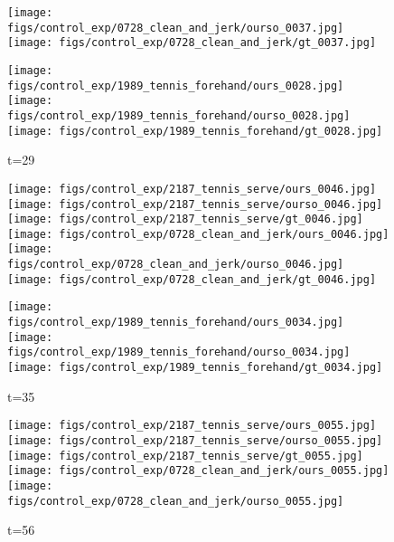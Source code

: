 \documentclass{article}
\begin{document}
\begin{appendix}
\begin{figure*}[!thbp]
\begin{subfigure}{0.12\linewidth}
  		\texttt{[image: figs/control\_exp/0728\_clean\_and\_jerk/ourso\_0037.jpg]}
  		\vspace{.2cm}
  		\texttt{[image: figs/control\_exp/0728\_clean\_and\_jerk/gt\_0037.jpg]}
  		\caption*{t=29}
  		\vspace{-7pt}
  		\texttt{[image: figs/control\_exp/1989\_tennis\_forehand/ours\_0028.jpg]}
  		\texttt{[image: figs/control\_exp/1989\_tennis\_forehand/ourso\_0028.jpg]}
  		\vspace{.2cm}
  		\texttt{[image: figs/control\_exp/1989\_tennis\_forehand/gt\_0028.jpg]}
	\end{subfigure}
	\begin{subfigure}{0.12\linewidth}
        \caption*{t=47}
        \vspace{-7pt}
	    \texttt{[image: figs/control\_exp/2187\_tennis\_serve/ours\_0046.jpg]}
	    \texttt{[image: figs/control\_exp/2187\_tennis\_serve/ourso\_0046.jpg]}
	    \vspace{.2cm}
  		\texttt{[image: figs/control\_exp/2187\_tennis\_serve/gt\_0046.jpg]}
  		\texttt{[image: figs/control\_exp/0728\_clean\_and\_jerk/ours\_0046.jpg]}
  		\texttt{[image: figs/control\_exp/0728\_clean\_and\_jerk/ourso\_0046.jpg]}
  		\vspace{.2cm}
  		\texttt{[image: figs/control\_exp/0728\_clean\_and\_jerk/gt\_0046.jpg]}
  		\caption*{t=35}
  		\vspace{-7pt}
  		\texttt{[image: figs/control\_exp/1989\_tennis\_forehand/ours\_0034.jpg]}
  		\texttt{[image: figs/control\_exp/1989\_tennis\_forehand/ourso\_0034.jpg]}
  		\vspace{.2cm}
  		\texttt{[image: figs/control\_exp/1989\_tennis\_forehand/gt\_0034.jpg]}
	\end{subfigure}
	\begin{subfigure}{0.12\linewidth}
        \caption*{t=56}
        \vspace{-7pt}
	    \texttt{[image: figs/control\_exp/2187\_tennis\_serve/ours\_0055.jpg]}
	    \texttt{[image: figs/control\_exp/2187\_tennis\_serve/ourso\_0055.jpg]}
	    \vspace{.2cm}
  		\texttt{[image: figs/control\_exp/2187\_tennis\_serve/gt\_0055.jpg]}
  		\texttt{[image: figs/control\_exp/0728\_clean\_and\_jerk/ours\_0055.jpg]}
  		\texttt{[image: figs/control\_exp/0728\_clean\_and\_jerk/ourso\_0055.jpg]}

\end{subfigure}
\end{figure*}
\end{appendix}
\end{document}

